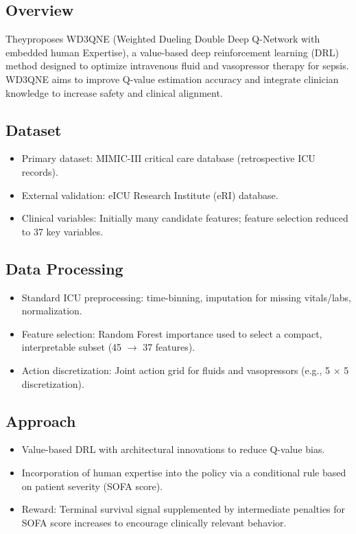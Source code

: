 \subsection*{Overview}
Theyproposes WD3QNE (Weighted Dueling Double Deep Q-Network with embedded human Expertise), a value-based deep reinforcement learning (DRL) method designed to optimize intravenous fluid and vasopressor therapy for sepsis. WD3QNE aims to improve Q-value estimation accuracy and integrate clinician knowledge to increase safety and clinical alignment.

\subsection*{Dataset}
\begin{itemize}
    \item Primary dataset: MIMIC-III critical care database (retrospective ICU records).
    \item External validation: eICU Research Institute (eRI) database.
    \item Clinical variables: Initially many candidate features; feature selection reduced to 37 key variables.
\end{itemize}

\subsection*{Data Processing}
\begin{itemize}
    \item Standard ICU preprocessing: time-binning, imputation for missing vitals/labs, normalization.
    \item Feature selection: Random Forest importance used to select a compact, interpretable subset (45 $\rightarrow$ 37 features).
    \item Action discretization: Joint action grid for fluids and vasopressors (e.g., 5 × 5 discretization).
\end{itemize}

\subsection*{Approach}
\begin{itemize}
    \item Value-based DRL with architectural innovations to reduce Q-value bias.
    \item Incorporation of human expertise into the policy via a conditional rule based on patient severity (SOFA score).
    \item Reward: Terminal survival signal supplemented by intermediate penalties for SOFA score increases to encourage clinically relevant behavior.
\end{itemize}

